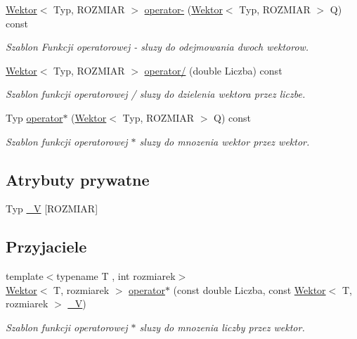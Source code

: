 \begin{DoxyCompactItemize}
\hyperlink{class_wektor}{Wektor}$<$ Typ, ROZMIAR $>$ \hyperlink{class_wektor_a369fcd56f09fe24c09582ab65f737cbf}{operator-\/} (\hyperlink{class_wektor}{Wektor}$<$ Typ, ROZMIAR $>$ Q) const 
\begin{DoxyCompactList}\small\item\em Szablon Funkcji operatorowej -\/ sluzy do odejmowania dwoch wektorow. \item\end{DoxyCompactList}\item 
\hyperlink{class_wektor}{Wektor}$<$ Typ, ROZMIAR $>$ \hyperlink{class_wektor_aa0e6e381f2099b4b6c8a0131e2c2f6e4}{operator/} (double Liczba) const 
\begin{DoxyCompactList}\small\item\em Szablon funkcji operatorowej / sluzy do dzielenia wektora przez liczbe. \item\end{DoxyCompactList}\item 
Typ \hyperlink{class_wektor_a4ef2829992c2337f21c78e36b3b08cb8}{operator$\ast$} (\hyperlink{class_wektor}{Wektor}$<$ Typ, ROZMIAR $>$ Q) const 
\begin{DoxyCompactList}\small\item\em Szablon funkcji operatorowej $\ast$ sluzy do mnozenia wektor przez wektor. \item\end{DoxyCompactList}\end{DoxyCompactItemize}
\subsection*{Atrybuty prywatne}
\begin{DoxyCompactItemize}
\item 
Typ \hyperlink{class_wektor_a0d996feb5ea3412a985abaac93060e4b}{\_\-V} \mbox{[}ROZMIAR\mbox{]}
\end{DoxyCompactItemize}
\subsection*{Przyjaciele}
\begin{DoxyCompactItemize}
\item 
{\footnotesize template$<$typename T , int rozmiarek$>$ }\\\hyperlink{class_wektor}{Wektor}$<$ T, rozmiarek $>$ \hyperlink{class_wektor_a2ac81a8a61e14506afca4629675977af}{operator$\ast$} (const double Liczba, const \hyperlink{class_wektor}{Wektor}$<$ T, rozmiarek $>$ \hyperlink{class_wektor_a0d996feb5ea3412a985abaac93060e4b}{\_\-V})
\begin{DoxyCompactList}\small\item\em Szablon funkcji operatorowej $\ast$ sluzy do mnozenia liczby przez wektor. \item\end{DoxyCompactList}\end{DoxyCompactItemize}


